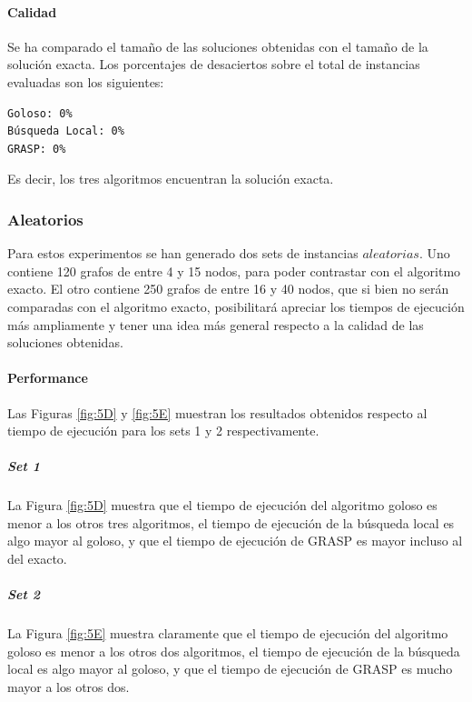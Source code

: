 \paragraph{Calidad} 
Se ha comparado el tamaño de las soluciones obtenidas con el tamaño de la solución exacta. Los porcentajes de desaciertos sobre el total de instancias evaluadas son los siguientes:

\begin{verbatim}
Goloso: 0%
Búsqueda Local: 0%
GRASP: 0%
\end{verbatim}

Es decir, los tres algoritmos encuentran la solución exacta.

\subsubsection{Aleatorios}

Para estos experimentos se han generado dos sets de instancias $aleatorias$. Uno contiene 120 grafos de entre 4 y 15 nodos, para poder contrastar con el algoritmo exacto. El otro contiene 250 grafos de entre 16 y 40 nodos, que si bien no serán comparadas con el algoritmo exacto, posibilitará apreciar los tiempos de ejecución más ampliamente y tener una idea más general respecto a la calidad de las soluciones obtenidas.

\paragraph{Performance} Las Figuras \ref{fig:5D} y \ref{fig:5E} muestran los resultados obtenidos respecto al tiempo de ejecución para los sets 1 y 2 respectivamente. 

\subparagraph{Set 1} La Figura \ref{fig:5D} muestra que el tiempo de ejecución del algoritmo goloso es menor a los otros tres algoritmos, el tiempo de ejecución de la búsqueda local es algo mayor al goloso, y que el tiempo de ejecución de GRASP es mayor incluso al del exacto.

\subparagraph{Set 2} La Figura \ref{fig:5E} muestra claramente que el tiempo de ejecución del algoritmo goloso es menor a los otros dos algoritmos, el tiempo de ejecución de la búsqueda local es algo mayor al goloso, y que el tiempo de ejecución de GRASP es mucho mayor a los otros dos.

